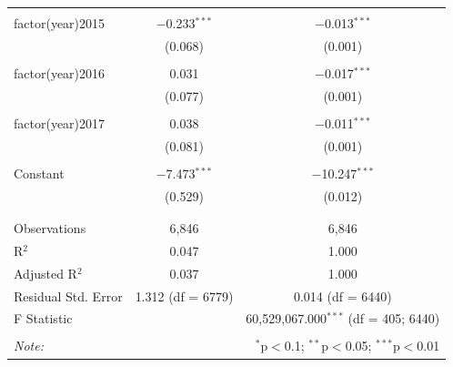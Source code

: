 \begin{table}[!htbp]
\begin{tabular}{@{\extracolsep{5pt}}lcc}
  & & \\ 
 factor(year)2015 & $-$0.233$^{***}$ & $-$0.013$^{***}$ \\ 
  & (0.068) & (0.001) \\ 
  & & \\ 
 factor(year)2016 & 0.031 & $-$0.017$^{***}$ \\ 
  & (0.077) & (0.001) \\ 
  & & \\ 
 factor(year)2017 & 0.038 & $-$0.011$^{***}$ \\ 
  & (0.081) & (0.001) \\ 
  & & \\ 
 Constant & $-$7.473$^{***}$ & $-$10.247$^{***}$ \\ 
  & (0.529) & (0.012) \\ 
  & & \\ 
\hline \\[-1.8ex] 
Observations & 6,846 & 6,846 \\ 
R$^{2}$ & 0.047 & 1.000 \\ 
Adjusted R$^{2}$ & 0.037 & 1.000 \\ 
Residual Std. Error & 1.312 (df = 6779) & 0.014 (df = 6440) \\ 
F Statistic &  & 60,529,067.000$^{***}$ (df = 405; 6440) \\ 
\hline 
\hline \\[-1.8ex] 
\textit{Note:}  & \multicolumn{2}{r}{$^{*}$p$<$0.1; $^{**}$p$<$0.05; $^{***}$p$<$0.01} \\ 
\end{tabular} 
\end{table} 
